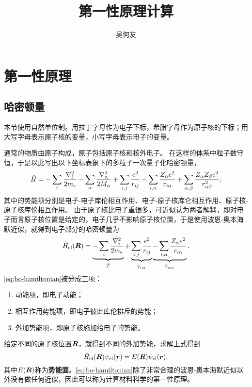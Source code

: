 \documentclass[hyperref, UTF8, a4paper]{ctexart}
\title{第一性原理计算}
\author{吴何友}
\begin{document}
\maketitle

\section{第一性原理}

\subsection{哈密顿量}

本节使用自然单位制。用拉丁字母作为电子下标，希腊字母作为原子核的下标；用大写字母表示原子核的变量，小写字母表示电子的变量。

通常的物质由原子构成，原子包括原子核和核外电子。
在这样的体系中粒子数守恒，于是以此写出以下坐标表象下的多粒子一次量子化哈密顿量，
\begin{equation}
    \hat{H} = - \sum_{i} \frac{\laplacian_i}{2 m_\text{e}} - \sum_{\alpha} \frac{\laplacian_\alpha}{2 M_\alpha}
    + \sum_{i, j} \frac{e^2}{r_{ij}} - \sum_{i, \alpha} \frac{Z_\alpha e^2}{r_{i\alpha}} + \sum_{\alpha, \beta} \frac{Z_\alpha Z_\beta e^2}{r_{\alpha \beta}^2},
\end{equation}
其中的势能项分别是电子-电子库伦相互作用、电子-原子核库仑相互作用、原子核-原子核库伦相互作用。
由于原子核比电子重很多，可近似认为两者解耦，即对电子而言原子核位置是给定的，电子几乎不影响原子核位置，于是使用波恩-奥本海默近似，就得到电子部分的哈密顿量为
\begin{equation}
    \hat{H}_\text{el}(\vb*{R}) = \underbrace{- \sum_{i} \frac{\laplacian_i}{2 m_\text{e}}}_{\hat{T}} + \underbrace{\sum_{i, j} \frac{e^2}{r_{ij}}}_{\hat{V}_\text{int}} \underbrace{- \sum_{i, \alpha} \frac{Z_\alpha e^2}{r_{i\alpha}}}_{\hat{V}_\text{ext}}.
    \label{eq:bo-hamiltonian}
\end{equation}
\eqref{eq:bo-hamiltonian}被分成三项：
\begin{enumerate}
    \item 动能项，即电子动能；
    \item 相互作用势能项，即电子彼此库伦排斥的势能；
    \item 外加势能项，即原子核施加给电子的势能。
\end{enumerate}
给定不同的原子核位置$\vb*{R}$，就得到不同的外加势能，求解上式得到
\begin{equation}
    \hat{H}_\text{el}(\vb*{R}) \psi_\text{el}(\vb*{r}) = E(\vb*{R}) \psi_\text{el}(\vb*{r}),
\end{equation}
其中$E(\vb*{R})$称为\textbf{势能面}。\eqref{eq:bo-hamiltonian}除了非常合理的波恩-奥本海默近似以外没有做任何近似，因此可以称为计算材料科学的第一性原理。
\end{document}
